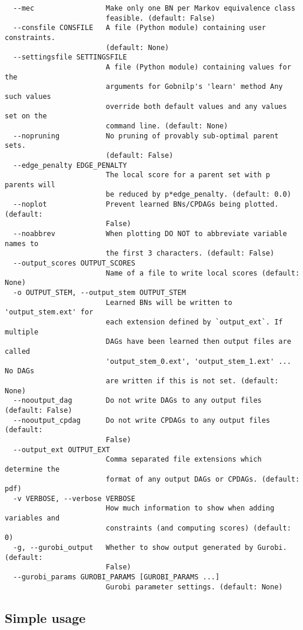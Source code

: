 \documentclass{article}
\begin{document}
\begin{verbatim}
  --mec                 Make only one BN per Markov equivalence class
                        feasible. (default: False)
  --consfile CONSFILE   A file (Python module) containing user constraints.
                        (default: None)
  --settingsfile SETTINGSFILE
                        A file (Python module) containing values for the
                        arguments for Gobnilp's 'learn' method Any such values
                        override both default values and any values set on the
                        command line. (default: None)
  --nopruning           No pruning of provably sub-optimal parent sets.
                        (default: False)
  --edge_penalty EDGE_PENALTY
                        The local score for a parent set with p parents will
                        be reduced by p*edge_penalty. (default: 0.0)
  --noplot              Prevent learned BNs/CPDAGs being plotted. (default:
                        False)
  --noabbrev            When plotting DO NOT to abbreviate variable names to
                        the first 3 characters. (default: False)
  --output_scores OUTPUT_SCORES
                        Name of a file to write local scores (default: None)
  -o OUTPUT_STEM, --output_stem OUTPUT_STEM
                        Learned BNs will be written to 'output_stem.ext' for
                        each extension defined by `output_ext`. If multiple
                        DAGs have been learned then output files are called
                        'output_stem_0.ext', 'output_stem_1.ext' ... No DAGs
                        are written if this is not set. (default: None)
  --nooutput_dag        Do not write DAGs to any output files (default: False)
  --nooutput_cpdag      Do not write CPDAGs to any output files (default:
                        False)
  --output_ext OUTPUT_EXT
                        Comma separated file extensions which determine the
                        format of any output DAGs or CPDAGs. (default: pdf)
  -v VERBOSE, --verbose VERBOSE
                        How much information to show when adding variables and
                        constraints (and computing scores) (default: 0)
  -g, --gurobi_output   Whether to show output generated by Gurobi. (default:
                        False)
  --gurobi_params GUROBI_PARAMS [GUROBI_PARAMS ...]
                        Gurobi parameter settings. (default: None)
\end{verbatim}

\subsection{Simple usage}
\label{sec:simple}
\end{document}
